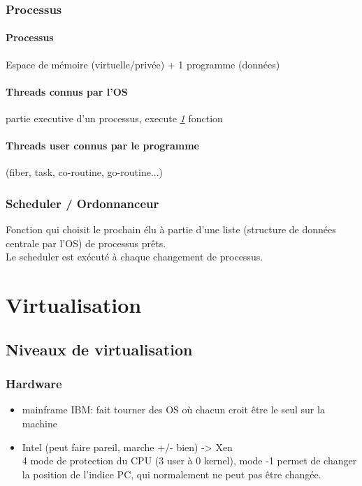 \documentclass[11pt]{article}
\begin{document}
\subsubsection{Processus}

\paragraph{Processus}
Espace de mémoire (virtuelle/privée) + 1 programme (données)
\paragraph{Threads connus par l'OS}
partie executive d'un processus, execute \underline{\textit{1}} fonction
\paragraph{Threads user connus par le programme}
(fiber, task, co-routine, go-routine...)

\subsubsection{Scheduler / Ordonnanceur}
Fonction qui choisit le prochain élu à partie d'une liste (structure de données centrale par l'OS) de processus prêts.\\
Le scheduler est exécuté à chaque changement de processus.

\begin{figure}[h!]
	\centering
\end{figure}

\pagebreak

\section{Virtualisation}
\subsection{Niveaux de virtualisation}
\subsubsection{Hardware}
\begin{itemize}

	\item mainframe IBM: fait tourner des OS où chacun croit être le seul sur la machine
	\item Intel (peut faire pareil, marche +/- bien) -> Xen\\
	      4 mode de protection du CPU (3 user à 0 kernel), mode -1 permet de changer la position de l'indice PC, qui normalement ne peut pas être changée.
\end{itemize}
\end{document}
